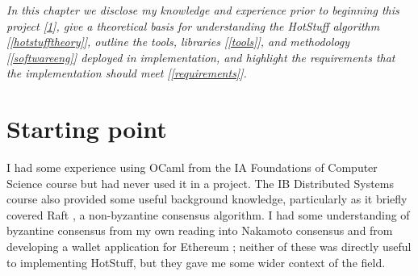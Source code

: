




\textit{In this chapter we disclose my knowledge and experience prior to beginning this project [\ref{start}], give a theoretical basis for understanding the HotStuff algorithm [\ref{hotstufftheory}], outline the tools, libraries [\ref{tools}], and methodology [\ref{softwareeng}] deployed in implementation, and highlight the requirements that the implementation should meet [\ref{requirements}].}

\section{Starting point} \label{start}
I had some experience using OCaml from the IA Foundations of Computer Science course but had never used it in a project. The IB Distributed Systems course also provided some useful background knowledge, particularly as it briefly covered Raft \cite{ongaro_search_nodate}, a non-byzantine consensus algorithm. I had some understanding of byzantine consensus from my own reading into Nakamoto consensus \cite{nakamoto_bitcoin_nodate} and from developing a wallet application for Ethereum \cite{wood_ethereum_nodate}; neither of these was directly useful to implementing HotStuff, but they gave me some wider context of the field.

